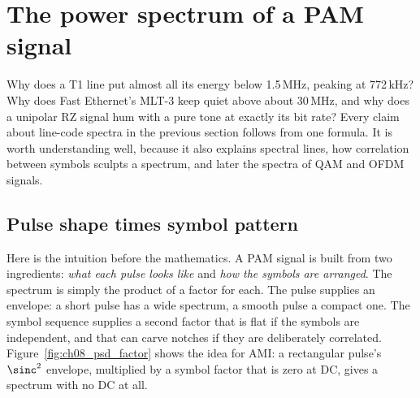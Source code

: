 \section{The power spectrum of a PAM signal}
\label{sec:ch08:psd}

Why does a T1 line put almost all its energy below 1.5\,MHz, peaking at 772\,kHz? Why does
Fast Ethernet's MLT-3 keep quiet above about 30\,MHz, and why does a unipolar RZ signal hum
with a pure tone at exactly its bit rate? Every claim about line-code spectra in the previous
section follows from one formula. It is worth understanding well, because it also explains
spectral lines, how correlation between symbols sculpts a spectrum, and later the spectra of
QAM and OFDM signals.

\subsection{Pulse shape times symbol pattern}

Here is the intuition before the mathematics. A PAM signal is built from two ingredients:
\emph{what each pulse looks like} and \emph{how the symbols are arranged}. The spectrum is
simply the product of a factor for each. The pulse supplies an envelope: a short pulse has a
wide spectrum, a smooth pulse a compact one. The symbol sequence supplies a second factor that
is flat if the symbols are independent, and that can carve notches if they are deliberately
correlated. Figure~\ref{fig:ch08_psd_factor} shows the idea for AMI: a rectangular pulse's
$\sinc^2$ envelope, multiplied by a symbol factor that is zero at DC, gives a spectrum with no
DC at all.



